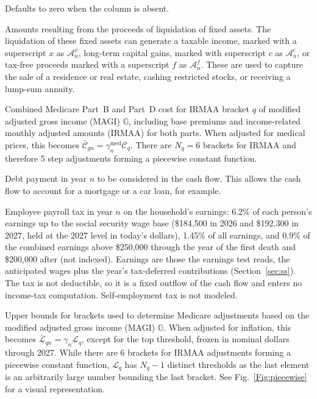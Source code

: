 \documentclass[fleqn,12pt]{report}
\begin{document}
\begin{description}[leftmargin=4em,style=multiline]
	Defaults to zero when the column is absent.
\item [$\mathcal{A}_n^*$]
	Amounts resulting from the proceeds of liquidation of fixed assets. The liquidation of these
	fixed assets can generate a taxable income, marked with a superscript $x$ as $\mathcal{A}_n^x$,
	long-term capital gains, marked with superscript $c$ as $\mathcal{A}_n^c$,
	or tax-free proceeds marked with a superscript $f$ as $\mathcal{A}_n^f$.
	These are used to capture the sale of a residence or real estate,
	cashing restricted stocks, or receiving a lump-sum annuity.
\item [$\mathcal{C}_{q}$]
	Combined Medicare Part~B and Part~D cost for IRMAA bracket $q$ of modified adjusted
	gross income (MAGI) $\mathbb{G}$, including base premiums and income-related monthly
	adjusted amounts (IRMAA) for both parts.
	When adjusted for medical prices, this becomes $\bar{\mathcal{C}}_{qn} = \gamma^{\mathrm{med}}_n\mathcal{C}_q$.
        There are $N_q = 6$ brackets for IRMAA and therefore 5 step adjustments forming
        a piecewise constant function.
\item [$\mathcal{D}_n$]
	Debt payment in year $n$ to be considered in the cash flow. This allows the cash flow to account
	for a mortgage or a car loan, for example.
\item [$\mathcal{F}_n$]
	Employee payroll tax in year $n$ on the household's earnings: 6.2\% of each person's earnings
	up to the social security wage base (\$184,500 in 2026 and \$192,300 in 2027, held at the 2027 level in today's dollars),
	1.45\% of all earnings, and 0.9\% of the combined earnings above \$250,000 through the year
	of the first death and \$200,000 after (not indexed).
	Earnings are those the earnings test reads, the anticipated wages plus the year's
	tax-deferred contributions (Section~\ref{sec:ss}).
	The tax is not deductible, so it is a fixed outflow of the cash flow and enters no
	income-tax computation. Self-employment tax is not modeled.
\item [$\mathcal{L}_{q}$]
	Upper bounds for brackets used to determine Medicare adjustments
	based on the modified adjusted gross income (MAGI) $\mathbb{G}$.
	When adjusted for inflation, this becomes $\bar{\mathcal{L}}_{qn} = \gamma_n\mathcal{L}_q$,
	except for the top threshold, frozen in nominal dollars through 2027.
        While there are 6 brackets for IRMAA adjustments forming a piecewise constant function,
	$\mathcal{L}_q$ has $N_q - 1$ distinct thresholds as the last element is an arbitrarily large
        number bounding the last bracket. See Fig.~\ref{Fig:piecewise} for a visual representation.

\end{description}
\end{document}
